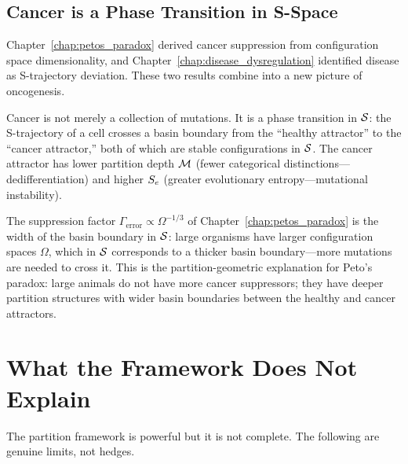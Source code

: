 \subsection{Cancer is a Phase Transition in S-Space}
\label{subsec:cancer_phase}

Chapter~\ref{chap:petos_paradox} derived cancer suppression from configuration
space dimensionality, and Chapter~\ref{chap:disease_dysregulation} identified
disease as S-trajectory deviation. These two results combine into a new picture
of oncogenesis.

Cancer is not merely a collection of mutations. It is a phase transition in
$\mathcal{S}$: the S-trajectory of a cell crosses a basin boundary from the
``healthy attractor'' to the ``cancer attractor,'' both of which are stable
configurations in $\mathcal{S}$. The cancer attractor has lower partition depth
$\mathcal{M}$ (fewer categorical distinctions---dedifferentiation) and higher
$S_e$ (greater evolutionary entropy---mutational instability).

The suppression factor $\Gamma_{\mathrm{error}} \propto \Omega^{-1/3}$ of
Chapter~\ref{chap:petos_paradox} is the width of the basin boundary in $\mathcal{S}$:
large organisms have larger configuration spaces $\Omega$, which in $\mathcal{S}$
corresponds to a thicker basin boundary---more mutations are needed to cross it.
This is the partition-geometric explanation for Peto's paradox: large animals
do not have more cancer suppressors; they have deeper partition structures with
wider basin boundaries between the healthy and cancer attractors.

\section{What the Framework Does Not Explain}
\label{sec:what_not_explained}

The partition framework is powerful but it is not complete. The following are
genuine limits, not hedges.

